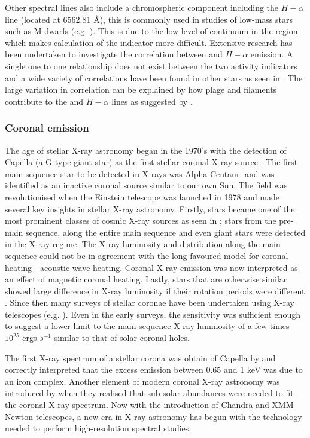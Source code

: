 Other spectral lines also include a chromospheric component including the $H-\alpha$ line (located at 6562.81 \AA), this is commonly used in studies of low-mass stars such as M dwarfs (e.g. \citealt{Newton_etal_2017}). This is due to the low level of continuum in the \caII region which makes calculation of the \Rprime indicator more difficult. Extensive research has been undertaken to investigate the correlation between \caII and $H-\alpha$ emission. A single one to one relationship does not exist between the two activity indicators and a wide variety of correlations have been found in other stars as seen in \citet{Cincunegui_etal_2007}. The large variation in correlation can be explained by how plage and filaments contribute to the \caII and $H-\alpha$ lines as suggested by \citet{Meunier_Delfosse_2009}.

\subsubsection{Coronal emission}
The age of stellar X-ray astronomy began in the 1970's with the detection of Capella (a G-type giant star) as the first stellar coronal X-ray source \citep{Catura_etal_1975}. The first main sequence star to be detected in X-rays was Alpha Centauri \citep{Nugent_Garmire_1978} and was identified as an inactive coronal source similar to our own Sun. The field was revolutionised when the Einstein telescope was launched in 1978 and made several key insights in stellar X-ray astronomy. Firstly, stars became one of the most prominent classes of cosmic X-ray sources as seen in \citet{Vaiana_etal_1981}; stars from the pre-main sequence, along the entire main sequence and even giant stars were detected in the X-ray regime. The X-ray luminosity and distribution along the main sequence could not be in agreement with the long favoured model for coronal heating - acoustic wave heating. Coronal X-ray emission was now interpreted as an effect of magnetic coronal heating. Lastly, stars that are otherwise similar showed large difference in X-ray luminosity if their rotation periods were different \citep{Pallavicini_etal_1981}. Since then many surveys of stellar coronae have been undertaken using X-ray telescopes (e.g. \citealt{Fleming_etal_1995,Schmitt_1997,Nebot_etal_2013,Wood_etal_2018}). Even in the early surveys, the sensitivity was sufficient enough to suggest a lower limit to the main sequence X-ray luminosity of a few times $10^{25}$ ergs $s^{-1}$ similar to that of solar coronal holes.

The first X-ray spectrum of a stellar corona was obtain of Capella by \citet{Cash_etal_1978} and correctly interpreted that the excess emission between 0.65 and 1 keV was due to an iron complex. Another element of modern coronal X-ray astronomy was introduced by \citet{Walter_etal_1978} when they realised that sub-solar abundances were needed to fit the coronal X-ray spectrum. Now with the introduction of Chandra and XMM-Newton telescopes, a new era in X-ray astronomy has begun with the technology needed to perform high-resolution spectral studies.

